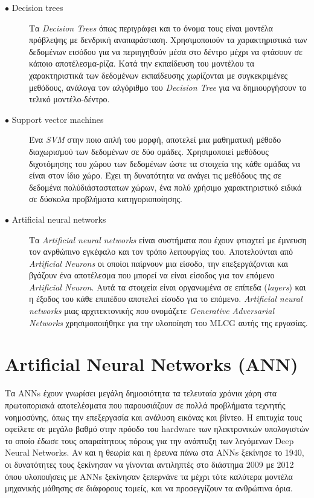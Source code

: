 \begin{description}

\item[$\bullet$ Decision trees] Τα \textit{Decision Trees} όπως περιγράφει και το όνομα τους είναι μοντέλα πρόβλεψης με δενδρική αναπαράσταση. Χρησιμοποιούν τα χαρακτηριστικά των δεδομένων εισόδου για να περιηγηθούν μέσα στο δέντρο μέχρι να φτάσουν σε κάποιο αποτέλεσμα-ρίζα. Κατά την εκπαίδευση του μοντέλου τα χαρακτηριστικά των δεδομένων εκπαίδευσης χωρίζονται με συγκεκριμένες μεθόδους, ανάλογα τον αλγόριθμο του \textit{Decision Tree} για να δημιουργήσουν το τελικό μοντέλο-δέντρο.

\item[$\bullet$ Support vector machines] Ένα \textit{SVM} στην ποιο απλή του μορφή, αποτελεί μια μαθηματική μέθοδο διαχωρισμού των δεδομένων σε δύο ομάδες. Χρησιμοποιεί μεθόδους διχοτόμησης του χώρου των δεδομένων ώστε τα στοιχεία της κάθε ομάδας να είναι στον ίδιο χώρο. Έχει τη δυνατότητα να ανάγει τις μεθόδους της σε δεδομένα πολύδιάσταστατων χώρων, ένα πολύ χρήσιμο χαρακτηριστικό ειδικά σε δύσκολα προβλήματα κατηγοριοποίησης. 

\item[$\bullet$ Artificial neural networks] Τα \textit{Artificial neural networks} είναι συστήματα που έχουν φτιαχτεί με έμνευση τον ανρθώπινο εγκέφαλο και τον τρόπο λειτουργίας του. Αποτελούνται από \textit{Artificial Neurons} οι οποίοι παίρνουν μια είσοδο, την επεξεργάζονται και βγάζουν ένα αποτέλεσμα που μπορεί να είναι είσοδος για τον επόμενο \textit{Artificial Neuron}. Αυτά τα στοιχεία είναι οργανωμένα σε επίπεδα (\textit{layers}) και η έξοδος του κάθε επιπέδου αποτελεί είσοδο για το επόμενο. \textit{Artificial neural networks} μιας αρχιτεκτονικής που ονομάζετε \textit{Generative Adversarial Networks} χρησιμοποιήθηκε για την υλοποίηση του MLCG αυτής της εργασίας.

\end{description}



\section{Artificial Neural Networks (ANN)}
Τα ANNs έχουν γνωρίσει μεγάλη δημοσιότητα τα τελευταία χρόνια χάρη στα πρωτοποριακά αποτελέσματα που παρουσιάζουν σε πολλά προβλήματα τεχνητής νοημοσύνης, όπως την επεξεργασία και ανάλυση εικόνας και βίντεο. Η επιτυχία τους οφείλετε σε μεγάλο βαθμό στην πρόοδο του hardware των ηλεκτρονικών υπολογιστών το οποίο έδωσε τους απαραίτητους πόρους για την ανάπτυξη των λεγόμενων Deep Neural Networks. Αν και η θεωρία και η έρευνα πάνω στα ANNs ξεκίνησε το 1940, οι δυνατότητες τους ξεκίνησαν να γίνονται αντιληπτές στο διάστημα 2009 με 2012 όπου υλοποιήσεις με ANNs ξεκίνησαν ξεπερνάνε τα μέχρι τότε καλύτερα μοντέλα μηχανικής μάθησης σε διάφορους τομείς, και να προσεγγίζουν τα ανθρώπινα όρια.

